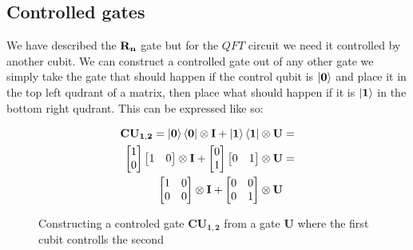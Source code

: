 \subsection{Controlled gates}
\newcommand{\qtcr}[1]{\mathbf{CR_{#1}}}
We have described the $\mathbf{R_{n}}$ gate but for the $QFT$ circuit we need it controlled by another cubit. We can construct a controlled gate out of any other gate we simply take the gate that should happen if the control qubit is $\ket{\mathbf{0}}$ and place it in the top left qudrant of a matrix, then place what should happen if it is $\ket{\mathbf{1}}$ in the bottom right qudrant. 
This can be expressed like so: 
\begin{figure}[H]
    \begin{align*}
        \mathbf{CU_{1,2}}=\ket{\mathbf{0}}\bra{\mathbf{0}}\otimes\mathbf{I} + \ket{\mathbf{1}}\bra{\mathbf{1}}\otimes\mathbf{U}&=\\
        \begin{bmatrix}
            1 \\
            0 \\
        \end{bmatrix}
        \begin{bmatrix}
            1 & 0 \\
        \end{bmatrix}
        \otimes\mathbf{I} + 
        \begin{bmatrix}
            0 \\
            1 \\
        \end{bmatrix}
        \begin{bmatrix}
            0 & 1 \\
        \end{bmatrix}
        \otimes\mathbf{U}&=\\
        \begin{bmatrix}
            1 & 0 \\
            0 & 0 \\
        \end{bmatrix}
        \otimes\mathbf{I} + 
        \begin{bmatrix}
            0 & 0 \\
            0 & 1 \\
        \end{bmatrix}
        \otimes\mathbf{U}& 
    \end{align*}
    \caption{Constructing a controled gate $\mathbf{CU_{1,2}}$ from a gate $\mathbf{U}$ where the first cubit controlls the second}
    \label{fig:CU1}
\end{figure}
